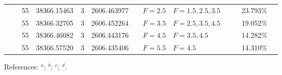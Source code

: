 \begin{table*}
\begin{center}
{\begin{tabular}{:l;l;c;l;c;l;c;l;l;c;c;c;c}
\rowstyle{\itshape}               &        & 55        & 38366.15463$^{}$                 & 3 &   2606.463977      &      & $F=2.5                                   $ & $F=1.5,2.5,3.5                           $ & $      $ &              & 23.793\%  & $     ^{}     $\\
\rowstyle{\itshape}               &        & 55        & 38366.32705$^{}$                 & 3 &   2606.452264      &      & $F=3.5                                   $ & $F=2.5,3.5,4.5                           $ & $      $ &              & 19.052\%  & $     ^{}     $\\
\rowstyle{\itshape}               &        & 55        & 38366.46082$^{}$                 & 3 &   2606.443176      &      & $F=4.5                                   $ & $F=3.5,4.5                               $ & $      $ &              & 14.282\%  & $     ^{}     $\\
\rowstyle{\itshape}               &        & 55        & 38366.57520$^{}$                 & 3 &   2606.435406      &      & $F=5.5                                   $ & $F=4.5                                   $ & $      $ &              & 14.310\%  & $     ^{}     $\\
\hline
\end{tabular}
}
{\footnotesize References:
$^{a}$\citet{Aldenius:2009:014008};
$^{b}$\citet{Blackwell-Whitehead:2005:705};
$^{c}$\citet{Nave:2012:1570};
$^{d}$\citet{Berengut:2004:064101}.}
\end{center}
\end{table*}
